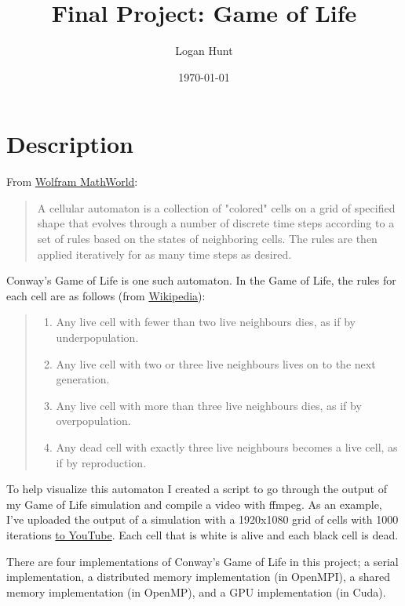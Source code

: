 \documentclass[11pt]{article}
\author{Logan Hunt}
\date{\today}
\title{Final Project: Game of Life}
\begin{document}
\maketitle

\section{Description}
\label{sec:orgee5348a}
From \href{https://mathworld.wolfram.com/CellularAutomaton.html}{Wolfram MathWorld}:

\begin{quote}
A cellular automaton is a collection of "colored" cells on a grid of specified shape that evolves through a number of discrete time steps according to a set of rules based on the states of neighboring cells. The rules are then applied iteratively for as many time steps as desired. 
\end{quote}

Conway's Game of Life is one such automaton. In the Game of Life, the rules for each cell are as follows (from \href{https://en.wikipedia.org/wiki/Conway\%27s\_Game\_of\_Life}{Wikipedia}):

\begin{quote}
\begin{enumerate}
\item Any live cell with fewer than two live neighbours dies, as if by underpopulation.
\item Any live cell with two or three live neighbours lives on to the next generation.
\item Any live cell with more than three live neighbours dies, as if by overpopulation.
\item Any dead cell with exactly three live neighbours becomes a live cell, as if by reproduction.
\end{enumerate}
\end{quote}

To help visualize this automaton I created a script to go through the output of my Game of Life simulation and compile a video with ffmpeg. As an example, I've uploaded the output of a simulation with a 1920x1080 grid of cells with 1000 iterations \href{https://www.youtube.com/watch?v=N\_aUWYNqpeY}{to YouTube}. Each cell that is white is alive and each black cell is dead.

There are four implementations of Conway's Game of Life in this project; a serial implementation, a distributed memory implementation (in OpenMPI), a shared memory implementation (in OpenMP), and a GPU implementation (in Cuda). 
\end{document}
